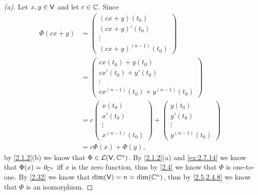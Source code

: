 \begin{proof}[(a)]
	Let \(x, y \in \mathsf{V}\) and let \(c \in \mathbb{C}\).
	Since
	\begin{align*}
		\Phi(cx + y) & = \begin{pmatrix}
			                 (cx + y)(t_0)  \\
			                 (cx + y)'(t_0) \\
			                 \vdots         \\
			                 (cx + y)^{(n - 1)}(t_0)
		                 \end{pmatrix}              \\
		             & = \begin{pmatrix}
			                 cx(t_0) + y(t_0)   \\
			                 cx'(t_0) + y'(t_0) \\
			                 \vdots             \\
			                 cx^{(n - 1)}(t_0) + y^{(n - 1)}(t_0)
		                 \end{pmatrix} \\
		             & = c \begin{pmatrix}
			                   x(t_0)  \\
			                   x'(t_0) \\
			                   \vdots  \\
			                   x^{(n - 1)}(t_0)
		                   \end{pmatrix} + \begin{pmatrix}
			                                   y(t_0)  \\
			                                   y'(t_0) \\
			                                   \vdots  \\
			                                   y^{(n - 1)}(t_0)
		                                   \end{pmatrix}   \\
		             & = c \Phi(x) + \Phi(y),
	\end{align*}
	by \cref{2.1.2}(b) we know that \(\Phi \in \mathcal{L}(\mathsf{V}, \mathbb{C}^n)\).
	By \cref{2.1.2}(a) and \cref{ex:2.7.14} we know that \(\Phi(x) = \mathit{0}_{\mathbb{C}^n}\) iff \(x\) is the zero function, thus by \cref{2.4} we know that \(\Phi\) is one-to-one.
	By \cref{2.32} we know that \(\dim(\mathsf{V}) = n = \dim(\mathbb{C}^n)\), thus by \cref{2.5,2.4.8} we know that \(\Phi\) is an isomorphism.
\end{proof}

